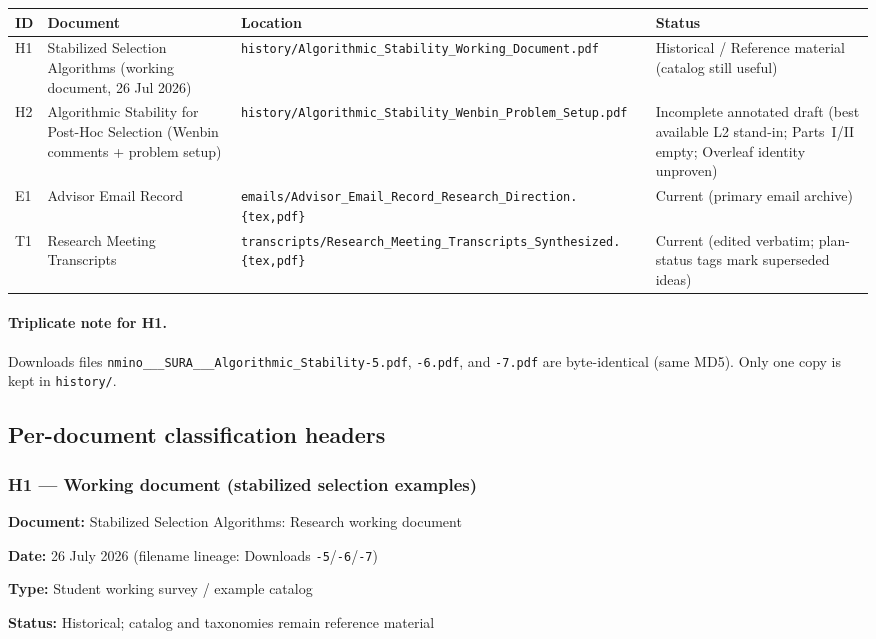 \documentclass[11pt]{article}
\newcommand{\Status}[1]{\textbf{Status:} #1}
\newcommand{\Meta}[2]{\par\noindent\textbf{#1:} #2\par}
\begin{document}
\begin{center}
\begin{tabularx}{\linewidth}{@{}l >{\RaggedRight\arraybackslash}X
  >{\RaggedRight\arraybackslash}X >{\RaggedRight\arraybackslash}X@{}}
\toprule
\textbf{ID} & \textbf{Document} & \textbf{Location} & \textbf{Status} \\
\midrule
H1 & Stabilized Selection Algorithms
    (working document, 26 Jul 2026) &
    \texttt{history/Algorithmic\_Stability\_Working\_Document.pdf} &
    Historical / Reference material
    (catalog still useful) \\
\addlinespace
H2 & Algorithmic Stability for Post-Hoc Selection
    (Wenbin comments + problem setup) &
    \texttt{history/Algorithmic\_Stability\_Wenbin\_Problem\_Setup.pdf} &
    Incomplete annotated draft
    (best available L2 stand-in; Parts~I/II empty;
    Overleaf identity unproven) \\
\addlinespace
E1 & Advisor Email Record &
    \texttt{emails/Advisor\_Email\_Record\_Research\_Direction.\{tex,pdf\}} &
    Current (primary email archive) \\
\addlinespace
T1 & Research Meeting Transcripts &
    \texttt{transcripts/Research\_Meeting\_Transcripts\_Synthesized.\{tex,pdf\}} &
    Current (edited verbatim;
    plan-status tags mark superseded ideas) \\
\bottomrule
\end{tabularx}
\end{center}

\paragraph{Triplicate note for H1.}
Downloads files \texttt{nmino\_\_\_SURA\_\_\_Algorithmic\_Stability-5.pdf}, \texttt{-6.pdf}, and
\texttt{-7.pdf} are byte-identical (same MD5). Only one copy is kept in \texttt{history/}.

\subsection{Per-document classification headers}

\subsubsection*{H1 --- Working document (stabilized selection examples)}
\Meta{Document}{Stabilized Selection Algorithms: Research working document}
\Meta{Date}{26 July 2026 (filename lineage: Downloads \texttt{-5}/{\texttt{-6}/{\texttt{-7}}})}
\Meta{Type}{Student working survey / example catalog}
\Status{Historical; catalog and taxonomies remain reference material}
\end{document}
